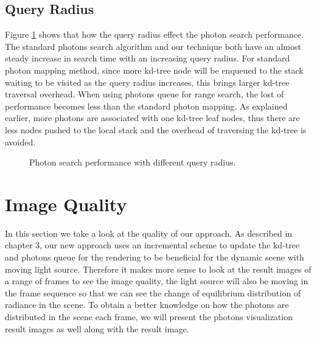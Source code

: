 \subsection{Query Radius}

Figure \ref{fig:photon_search_2} shows that how the query radius effect the photon search performance. The standard photons search algorithm and our technique both have an almost steady increase in search time with an increasing query radius. For standard photon mapping method, since more kd-tree node will be enqueued to the stack waiting to be visited as the query radius increases, this brings larger kd-tree traversal overhead. When using photons queue for range search, the lost of performance becomes less than the standard photon mapping. As explained earlier, more photons are associated with one kd-tree leaf nodes, thus there are less nodes pushed to the local stack and the overhead of traversing the kd-tree is avoided. 

\begin{figure}[ftp] 
    \centering 
    \renewcommand{\thefigure}{\thechapter.\arabic{figure}}
    \caption[]{Photon search performance with different query radius. }
    \label{fig:photon_search_2}  
\end{figure} 

\section{Image Quality}

In this section we take a look at the quality of our approach. As described in chapter 3, our new approach uses an incremental scheme to update the kd-tree and photons queue for the rendering to be beneficial for the dynamic scene with moving light source. Therefore it makes more sense to look at the result images of a range of frames to see the image quality, the light source will also be moving in the frame sequence so that we can see the change of equilibrium distribution of radiance in the scene. To obtain a better knowledge on how the photons are distributed in the scene each frame, we will present the photons visualization result images as well along with the result image. 

